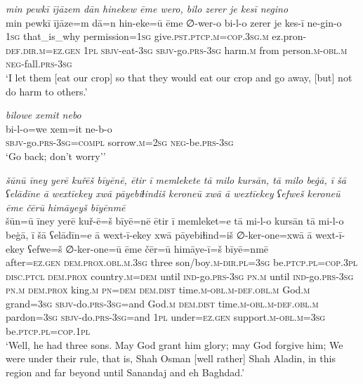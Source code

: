 \ea \label{PM.36}
\textit{min pewkī ījāzem dān hinekew ēme wero, bilo zerer je kesī negino} \\ 
\gll min pewkī ījāze=m dā=n hin-eke=ū ēme ∅-wer-o bi-l-o zerer je kes-ī ne-gin-o \\ 
 \textsc{1sg} that\_is\_why permission\textsc{=\textsc{1sg}} give\textsc{.pst}\textsc{.ptcp}\textsc{.m}\textsc{=cop}\textsc{.3sg}\textsc{.m} ez.pron\textsc{-def}\textsc{.dir}\textsc{.m}\textsc{\textsc{=ez.gen}} \textsc{1pl} \textsc{sbjv-}eat\textsc{-3sg} \textsc{sbjv-}go\textsc{.prs}\textsc{-3sg} harm\textsc{.m} from person\textsc{.m}\textsc{-obl}\textsc{.m} \textsc{neg-}fall\textsc{.prs}\textsc{-3sg} \\ 
\glt `I let them [eat our crop] so that they would eat our crop and go away, [but] not do harm to others.'
\z 
 
\ea \label{PM.40}
\textit{bilowe xemit nebo} \\ 
\gll bi-l-o=we xem=it ne-b-o \\ 
 \textsc{sbjv-}go\textsc{.prs}\textsc{-3sg}\textsc{=compl} sorrow\textsc{.m}\textsc{=\textsc{2sg}} \textsc{neg-}be\textsc{.prs}\textsc{-3sg} \\ 
\glt `Go back; don’t worry’'
\z 
 
\ea \label{DG.4}
\textit{šūnū īney yerē kuřēš bīyēnē, ētir ī memlekete tā milo kursān, tā milo beġā, ī šā ʕelādīne ā wextīekey xwā pāyebiɫindiš keroneū xwā ā wextīekey ʕefweš keroneū ēme čērū himāyeyš bīyēnmē} \\ 
\gll šūn=ū īney yerē kuř-ē=š bīyē=nē ētir ī memleket=e tā mi-l-o kursān tā mi-l-o beġā, ī šā ʕelādīn=e ā wext-ī-ekey xwā pāyebiɫind=iš ∅-ker-one=xwā ā wext-ī-ekey ʕefwe=š ∅-ker-one=ū ēme čēr=ū himāye-ī=š bīyē=nmē \\ 
 after\textsc{=ez}\textsc{.gen} \textsc{dem.prox}\textsc{.obl}\textsc{.m}\textsc{.3sg} three son/boy\textsc{.m}\textsc{-dir}\textsc{.pl}\textsc{=3sg} be\textsc{.ptcp}\textsc{.pl}\textsc{=cop}\textsc{.3pl} \textsc{disc.ptcl} \textsc{dem.prox} country\textsc{.m}\textsc{=dem} until \textsc{ind-}go\textsc{.prs}\textsc{-3sg} \textsc{pn}\textsc{.m} until \textsc{ind-}go\textsc{.prs}\textsc{-3sg} \textsc{pn}\textsc{.m} \textsc{dem.prox} king\textsc{.m} \textsc{pn}\textsc{=dem} \textsc{dem.dist} time\textsc{.m}\textsc{-obl}\textsc{.m}\textsc{-def}\textsc{.obl}\textsc{.m} God\textsc{.m} grand\textsc{=3sg} \textsc{sbjv-}do\textsc{.prs}\textsc{-3sg}=and God\textsc{.m} \textsc{dem.dist} time\textsc{.m}\textsc{-obl}\textsc{.m}\textsc{-def}\textsc{.obl}\textsc{.m} pardon\textsc{=3sg} \textsc{sbjv-}do\textsc{.prs}\textsc{-3sg}=and \textsc{1pl} under\textsc{=ez}\textsc{.gen} support\textsc{.m}\textsc{-obl}\textsc{.m}\textsc{=3sg} be\textsc{.ptcp}\textsc{.pl}\textsc{=cop}\textsc{.1pl} \\ 
\glt `Well, he had three sons. May God grant him glory; may God forgive him; We were under their rule, that is, Shah Osman [well rather] Shah Aladin, in this region and far beyond until Sanandaj and eh Baghdad.'
\z 
 
